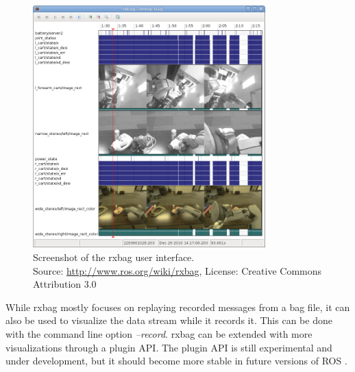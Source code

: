 \begin{figure}[htbp]
  \centering
  \includegraphics[width=0.8\textwidth]{img/rxbag_screenshot.png}
  \caption{Screenshot of the rxbag user interface.\\Source: \url{http://www.ros.org/wiki/rxbag}, License: Creative Commons Attribution 3.0}
  \label{rxbag_screenshot}
\end{figure}

While rxbag mostly focuses on replaying recorded messages from a bag file, it can also be used to visualize the data stream while it records it. This can be done with the command line option \emph{--record}. rxbag can be extended with more visualizations through a plugin API. The plugin API is still experimental and under development, but it should become more stable in future versions of ROS \cite{rxbag}.



